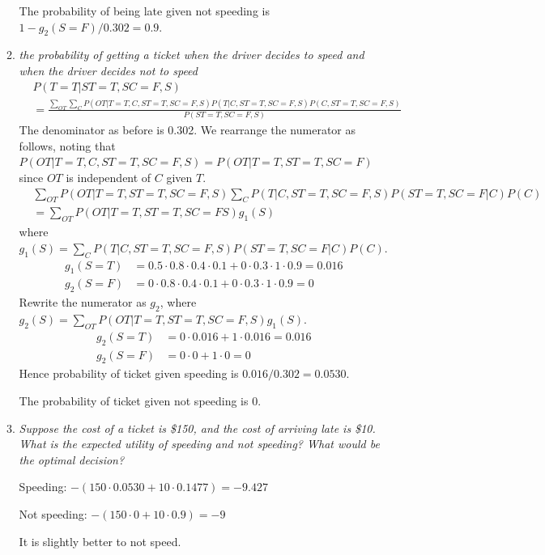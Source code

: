 \documentclass{article}
\begin{document}
\begin{enumerate}[(a)]
\begin{enumerate}
    The probability of being late given not speeding is $1-g_2(S=F)/0.302=0.9$.

  \item \textit{the probability of getting a ticket when the driver
    decides to speed and when the driver decides not to speed}
    \begin{align*}
    &P(T=T|ST=T,SC=F,S)\\
    &=\frac{\sum_{OT}\sum_C P(OT|T=T,C,ST=T,SC=F,S)P(T|C,ST=T,SC=F,S)P(C,ST=T,SC=F,S)}{P(ST=T,SC=F,S)}
    \end{align*}
    The denominator as before is 0.302. We rearrange the numerator as follows, noting that
    $P(OT|T=T,C,ST=T,SC=F,S)=P(OT|T=T,ST=T,SC=F)$ since $OT$ is independent of $C$ given $T$.
    \begin{align*}
    &\sum_{OT} P(OT|T=T,ST=T,SC=F,S)\sum_C P(T|C,ST=T,SC=F,S)P(ST=T,SC=F|C)P(C)\\
    &=\sum_{OT} P(OT|T=T,ST=T,SC=FS)g_1(S)
    \end{align*}
    where $g_1(S)=\sum_C P(T|C,ST=T,SC=F,S)P(ST=T,SC=F|C)P(C)$.
    \begin{align*}
    g_1(S=T)&=0.5\cdot 0.8\cdot 0.4\cdot 0.1+0\cdot 0.3\cdot 1\cdot 0.9=0.016\\
    g_2(S=F)&=0\cdot 0.8\cdot 0.4\cdot 0.1+0\cdot 0.3\cdot 1\cdot 0.9=0
    \end{align*}
    Rewrite the numerator as $g_2$, where $g_2(S)=\sum_{OT}P(OT|T=T,ST=T,SC=F,S)g_1(S)$.
    \begin{align*}
    g_2(S=T)&=0\cdot 0.016+1\cdot 0.016=0.016\\
    g_2(S=F)&=0\cdot 0+1\cdot 0=0
    \end{align*}
    Hence probability of ticket given speeding is $0.016/0.302=0.0530$.

    The probability
    of ticket given not speeding is 0.


  \item \textit{Suppose the cost of a ticket is \$150, and the cost of
    arriving late is \$10. What is the expected utility of speeding
    and not speeding?  What would be the optimal decision?}

    Speeding: $-(150\cdot 0.0530 +10\cdot 0.1477)=-9.427$

    Not speeding: $-(150\cdot 0 +10\cdot 0.9)=-9$

    It is slightly better to not speed.

  \end{enumerate}

\end{enumerate}
\end{document}
